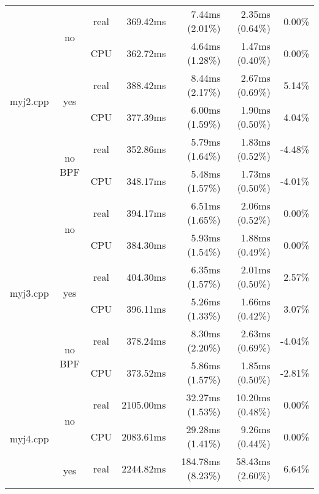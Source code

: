 \documentclass[en]{pracamgr}
\begin{document}
\begin{appendices}
\begin{small}
\begin{longtable}{|l|c|c|r|r|r|r|}
\hline
\multirow{6}{*}{myj2.cpp}   & \multirow{2}{*}{no}     & real & 369.42ms & 7.44ms (2.01\%) & 2.35ms (0.64\%) & 0.00\% \\*
                            &                         & CPU  & 362.72ms & 4.64ms (1.28\%) & 1.47ms (0.40\%) & 0.00\% \\*
                            \cline{2-7}
                            & \multirow{2}{*}{yes}    & real & 388.42ms & 8.44ms (2.17\%) & 2.67ms (0.69\%) & 5.14\% \\*
                            &                         & CPU  & 377.39ms & 6.00ms (1.59\%) & 1.90ms (0.50\%) & 4.04\% \\*
                            \cline{2-7}
                            & \multirow{2}{*}{no BPF} & real & 352.86ms & 5.79ms (1.64\%) & 1.83ms (0.52\%) & -4.48\% \\*
                            &                         & CPU  & 348.17ms & 5.48ms (1.57\%) & 1.73ms (0.50\%) & -4.01\% \\
\hline
\multirow{6}{*}{myj3.cpp}   & \multirow{2}{*}{no}     & real & 394.17ms & 6.51ms (1.65\%) & 2.06ms (0.52\%) & 0.00\% \\*
                            &                         & CPU  & 384.30ms & 5.93ms (1.54\%) & 1.88ms (0.49\%) & 0.00\% \\*
                            \cline{2-7}
                            & \multirow{2}{*}{yes}    & real & 404.30ms & 6.35ms (1.57\%) & 2.01ms (0.50\%) & 2.57\% \\*
                            &                         & CPU  & 396.11ms & 5.26ms (1.33\%) & 1.66ms (0.42\%) & 3.07\% \\*
                            \cline{2-7}
                            & \multirow{2}{*}{no BPF} & real & 378.24ms & 8.30ms (2.20\%) & 2.63ms (0.69\%) & -4.04\% \\*
                            &                         & CPU  & 373.52ms & 5.86ms (1.57\%) & 1.85ms (0.50\%) & -2.81\% \\
\hline
\multirow{6}{*}{myj4.cpp}   & \multirow{2}{*}{no}     & real & 2105.00ms & 32.27ms (1.53\%) & 10.20ms (0.48\%) & 0.00\% \\*
                            &                         & CPU  & 2083.61ms & 29.28ms (1.41\%) & 9.26ms (0.44\%) & 0.00\% \\*
                            \cline{2-7}
                            & \multirow{2}{*}{yes}    & real & 2244.82ms & 184.78ms (8.23\%) & 58.43ms (2.60\%) & 6.64\% \\*

\end{longtable}
\end{small}
\end{appendices}
\end{document}
